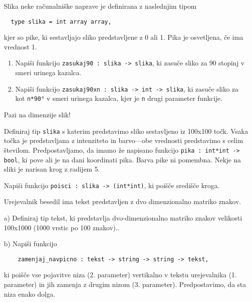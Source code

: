 \begin{ex}
  Slika neke ra\v cunalni\v ske naprave je definirana z naslednjim
  tipom

  \begin{lstlisting}
  type slika = int array array,
  \end{lstlisting}
  kjer so pike, ki sestavljajo sliko predstavljene z 0 ali 1. Pika je
  osvetljena, \v ce ima vrednost 1.

  \begin{enumerate}[label=(\roman*)]
  \item Napi\v si funkcijo \lstinline{zasukaj90 : slika -> slika}, ki
    zasu\v ce sliko za 90 stopinj v smeri urinega kazalca.

  \item Napi\v si funkcijo 
  \lstinline{zasukaj90xn : slika -> int -> slika}, 
  ki zasu\v ce sliko za kot \lstinline{n*90°} v smeri urinega
    kazalca, kjer je \lstinline{n} drugi parameter funkcije.
  \end{enumerate}

  Pazi na dimenzije slik!


\end{ex} 
\begin{ex}
  Definiraj tip \lstinline{slika} s katerim predstavimo sliko sestavljeno
  iz 100x100 to\v ck. Vsaka to\v cka je predstavljana z intenziteto in
  barvo---obe vrednosti predstavimo s celim \v stevilom.
  Predpostavljamo, da imamo \v ze napisano funkcijo \lstinline{pika : int*int -> bool}, 
  ki pove ali je na dani koordinati pika. Barva
  pike ni pomembna.
  Nekje na sliki je narisan krog z radijem 5. 
  
  \noindent Napi\v si funkcijo
  \lstinline{poisci : slika -> (int*int)}, ki poi\v s\v ce sredi\v s\v ce
  kroga.


\end{ex} 
\begin{ex}
  Urejevalnik besedil ima tekst predstavljen z dvo dimenzionalno
  matriko znakov.

  a) Definiraj tip tekst, ki predstavlja dvo-dimenzionalno matriko
  znakov velikosti 100x1000 (1000 vrstic po 100 znakov)..

  b) Napi\v si funkcijo

\begin{lstlisting}
    zamenjaj_navpicno : tekst -> string -> string -> tekst, 
\end{lstlisting}
  ki poi\v s\v ce vse pojavitve niza (2. parameter) vertikalno v
  tekstu urejevalnika (1. parameter) in jih zamenja z drugim nizom
  (3. parameter). Predpostavimo, da sta niza enako dolga.


\end{ex} 
